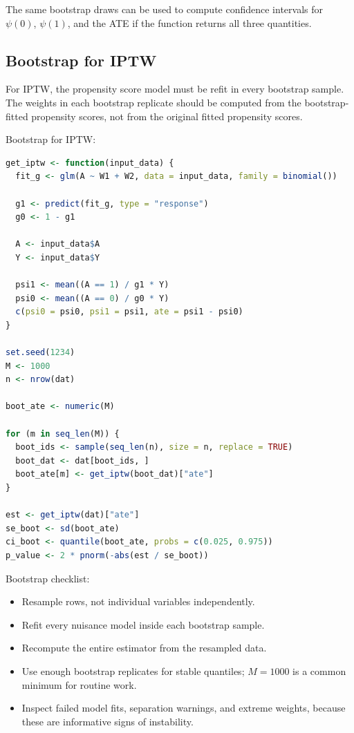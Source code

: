 The same bootstrap draws can be used to compute confidence intervals for
$\psi(0)$, $\psi(1)$, and the ATE if the function returns all three quantities.

\subsection{Bootstrap for IPTW}

For IPTW, the propensity score model must be refit in every bootstrap sample. The
weights in each bootstrap replicate should be computed from the bootstrap-fitted
propensity scores, not from the original fitted propensity scores.

\begin{implementationbox}
Bootstrap for IPTW:
\begin{lstlisting}[language=R]
get_iptw <- function(input_data) {
  fit_g <- glm(A ~ W1 + W2, data = input_data, family = binomial())

  g1 <- predict(fit_g, type = "response")
  g0 <- 1 - g1

  A <- input_data$A
  Y <- input_data$Y

  psi1 <- mean((A == 1) / g1 * Y)
  psi0 <- mean((A == 0) / g0 * Y)
  c(psi0 = psi0, psi1 = psi1, ate = psi1 - psi0)
}

set.seed(1234)
M <- 1000
n <- nrow(dat)

boot_ate <- numeric(M)

for (m in seq_len(M)) {
  boot_ids <- sample(seq_len(n), size = n, replace = TRUE)
  boot_dat <- dat[boot_ids, ]
  boot_ate[m] <- get_iptw(boot_dat)["ate"]
}

est <- get_iptw(dat)["ate"]
se_boot <- sd(boot_ate)
ci_boot <- quantile(boot_ate, probs = c(0.025, 0.975))
p_value <- 2 * pnorm(-abs(est / se_boot))
\end{lstlisting}
\end{implementationbox}

\begin{estimationbox}
Bootstrap checklist:
\begin{itemize}
\item Resample rows, not individual variables independently.
\item Refit every nuisance model inside each bootstrap sample.
\item Recompute the entire estimator from the resampled data.
\item Use enough bootstrap replicates for stable quantiles; $M=1000$ is a common
minimum for routine work.
\item Inspect failed model fits, separation warnings, and extreme weights, because
these are informative signs of instability.
\end{itemize}
\end{estimationbox}
